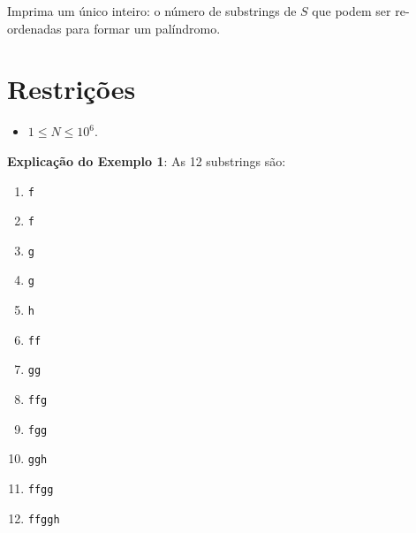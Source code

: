 Imprima um único inteiro: o número de substrings de $S$ que podem ser re-ordenadas para formar um palíndromo.


\section*{Restrições}

\begin{itemize}
\item $1 \leq N \leq 10^6$.
\end{itemize}

\exemplo

\bigskip
\textbf{Explicação do Exemplo 1}: As 12 substrings são:

\begin{multicols}{2}
\begin{enumerate}
	\item {\tt f}
	\item {\tt f}
	\item {\tt g}
	\item {\tt g}
	\item {\tt h}
	\item {\tt ff}
	\item {\tt gg}
	\item {\tt ffg}
	\item {\tt fgg}
	\item {\tt ggh}
	\item {\tt ffgg}
	\item {\tt ffggh}
\end{enumerate}
\end{multicols}
